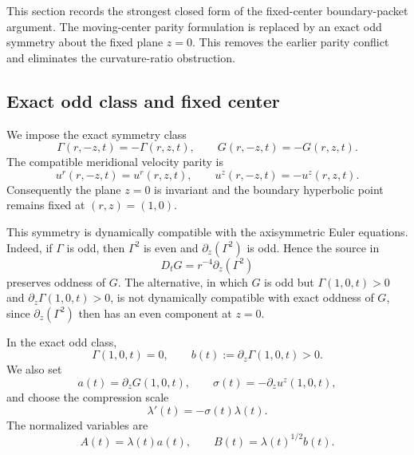 \documentclass[11pt]{amsart}
\begin{document}
This section records the strongest closed form of the fixed-center boundary-packet argument.  The moving-center parity formulation is replaced by an exact odd symmetry about the fixed plane \(z=0\).  This removes the earlier parity conflict and eliminates the curvature-ratio obstruction.

\subsection{Exact odd class and fixed center}

We impose the exact symmetry class
\begin{equation}\label{eq:exact_odd_class_final}
\Gamma(r,-z,t)=-\Gamma(r,z,t),
\qquad
G(r,-z,t)=-G(r,z,t).
\end{equation}
The compatible meridional velocity parity is
\begin{equation}\label{eq:velocity_parity_final}
u^r(r,-z,t)=u^r(r,z,t),
\qquad
u^z(r,-z,t)=-u^z(r,z,t).
\end{equation}
Consequently the plane \(z=0\) is invariant and the boundary hyperbolic point remains fixed at \((r,z)=(1,0)\).

This symmetry is dynamically compatible with the axisymmetric Euler equations.  Indeed, if \(\Gamma\) is odd, then \(\Gamma^2\) is even and \(\partial_z(\Gamma^2)\) is odd.  Hence the source in
\[
D_tG=r^{-4}\partial_z(\Gamma^2)
\]
preserves oddness of \(G\).  The alternative, in which \(G\) is odd but \(\Gamma(1,0,t)>0\) and \(\partial_z\Gamma(1,0,t)>0\), is not dynamically compatible with exact oddness of \(G\), since \(\partial_z(\Gamma^2)\) then has an even component at \(z=0\).

In the exact odd class,
\begin{equation}\label{eq:Gamma_zero_center}
\Gamma(1,0,t)=0,
\qquad
b(t):=\partial_z\Gamma(1,0,t)>0.
\end{equation}
We also set
\begin{equation}\label{eq:a_b_final}
a(t)=\partial_zG(1,0,t),
\qquad
\sigma(t)=-\partial_z u^z(1,0,t),
\end{equation}
and choose the compression scale
\begin{equation}\label{eq:lambda_final}
\lambda'(t)=-\sigma(t)\lambda(t).
\end{equation}
The normalized variables are
\begin{equation}\label{eq:A_B_final}
A(t)=\lambda(t)a(t),
\qquad
B(t)=\lambda(t)^{1/2}b(t).
\end{equation}
\end{document}
